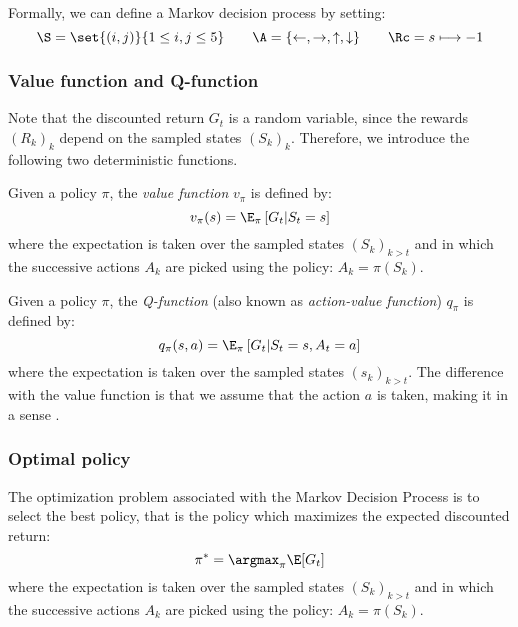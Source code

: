 Formally, we can define a Markov decision process by setting:
\begin{equation*}
    \S=\set{(i,j)}{1\leq i,j\leq5} \qquad \A=\{\leftarrow,\rightarrow,\uparrow,\downarrow\} \qquad \Rc=s\longmapsto-1
\end{equation*}


\subsubsection{Value function and Q-function}
Note that the discounted return $G_t$ is a random variable, since the rewards $(R_k)_k$ depend on the sampled states $(S_k)_k$. 
Therefore, we introduce the following two deterministic functions.

\begin{definition}
    Given a policy $\pi$, the \emph{value function} $v_\pi$ is defined by:
    \begin{equation*}
        v_\pi(s) = \E_\pi\left[G_t|S_t=s\right]
    \end{equation*}
    where the expectation is taken over the sampled states $(S_k)_{k>t}$ and in which the successive actions $A_k$ are picked using the policy: $A_k=\pi(S_k)$.
\end{definition}

\begin{definition}[Q-function]
    Given a policy $\pi$, the \emph{Q-function} (also known as \emph{action-value function}) $q_\pi$ is defined by:
    \begin{equation*}
        q_\pi(s, a) = \E_\pi\left[G_t|S_t=s, A_t=a\right]
    \end{equation*}
    where the expectation is taken over the sampled states $(s_k)_{k>t}$. The difference with the value function is that we assume that the action $a$ is taken, making it in a sense .
\end{definition}

\subsubsection{Optimal policy}
The optimization problem associated with the Markov Decision Process is to select the best policy, that is the policy which maximizes the expected discounted return:
\begin{equation}
    \pi^*=\argmax_\pi \E[G_t]
\end{equation}
where the expectation is taken over the sampled states $(S_k)_{k>t}$ and in which the successive actions $A_k$ are picked using the policy: $A_k=\pi(S_k)$.

